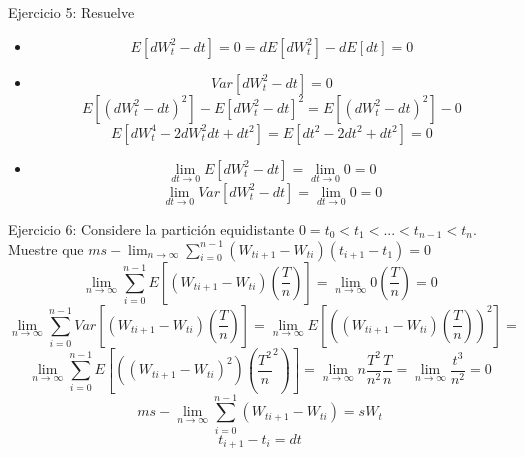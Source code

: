 \documentclass[11pt,fleqn]{book} %
\numberwithin{equation}{section} %
\numberwithin{figure}{section} %
\numberwithin{table}{section} %
\begin{document}
Ejercicio 5: Resuelve
\begin{itemize}
    \item $$E[dW_{t}^{2} -dt] = 0 = dE[dW_{t}^{2}] - dE[dt] = 0$$
    \item $$ Var[dW_{t}^{2} -dt] = 0$$
    $$ E[(dW_{t}^{2} -dt)^{2}] - E[dW_{t}^{2} -dt]^{2} = E[(dW_{t}^{2} -dt)^{2}] - 0 $$
    $$ E[dW_{t}^{4} - 2dW_{t}^{2}dt + dt^{2}] = E[dt^{2} -2dt^{2} + dt^{2}] = 0  $$
    \item $$ \lim_{dt \to 0} E[dW_{t}^{2} -dt] = \lim_{dt \to 0} 0= 0$$
    $$ \lim_{dt \to 0} Var[dW_{t}^{2} -dt] = \lim_{dt \to 0} 0 = 0  $$
\end{itemize}
Ejercicio 6: Considere la partición equidistante $0 = t_{0} < t_{1} < ... < t_{n-1} < t_{n}$. Muestre que $ms-\lim_{n \to \infty} \sum_{i = 0}^{n-1} (W_{ti+1} - W_{ti})(t_{i+1} - t_{1}) = 0 $
$$ \lim_{n \to \infty} \sum_{i = 0}^{n-1} E[(W_{ti+1} - W_{ti})(\frac{T}{n})] =  \lim_{n \to \infty} 0(\frac{T}{n}) = 0   $$
$$ \lim_{n \to \infty} \sum_{i = 0}^{n-1} Var[(W_{ti+1} - W_{ti})(\frac{T}{n})] =  \lim_{n \to \infty} E[((W_{ti+1} - W_{ti})(\frac{T}{n}))^{2}] =  $$
$$ \lim_{n \to \infty} \sum_{i = 0}^{n-1} E[((W_{ti+1} - W_{ti})^{2})(\frac{T^{2}}{n}^{2})] = \lim_{n \to \infty} n\frac{T^{2}}{n^{2}} \frac{T}{n} = \lim_{n \to \infty} \frac{t^{3}}{n^{2}} = 0 $$
$$ ms-\lim_{n \to \infty} \sum_{i = 0}^{n-1} (W_{ti+1} - W_{ti}) = sW_{t} $$
$$ t_{i+1} - t_{i} = dt $$
\end{document}
